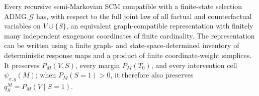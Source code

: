 Every recursive semi-Markovian SCM compatible with a finite-state selection ADMG \(\mathcal G\) has, with respect to the full joint law of all factual and counterfactual variables on \(V\cup\{S\}\), an equivalent graph-compatible representation with finitely many independent exogenous coordinates of finite cardinality.  The representation can be written using a finite graph- and state-space-determined inventory of deterministic response maps and a product of finite coordinate-weight simplices.  It preserves \(P_M(V,S)\), every margin \(P_M(T_0)\), and every intervention cell \(\psi_{x,y}(M)\); when \(P_M(S=1)>0\), it therefore also preserves \(q_S^M=P_M(V\mid S=1)\).